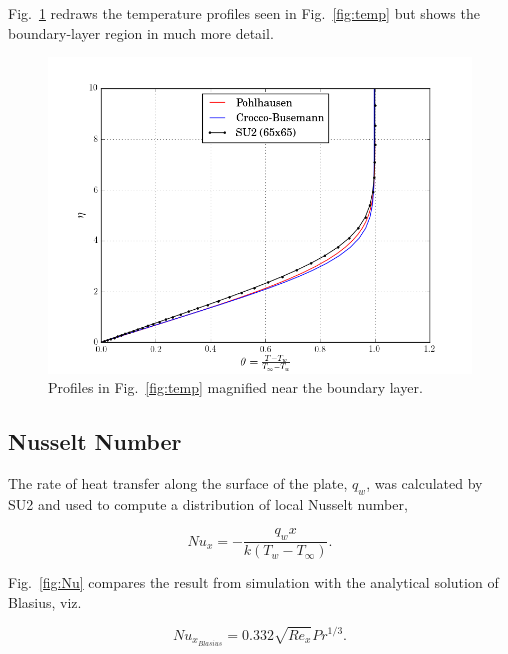 \documentclass[12pt,letterpaper]{article}
\begin{document}
Fig.~\ref{fig:temp_zoom} redraws the temperature profiles seen in Fig.~\ref{fig:temp} but shows the boundary-layer region in much more detail.
 
\begin{figure}[h] 
\centering
\includegraphics[width=\linewidth]{temp_350_zoom.png}
\caption{Profiles in Fig.~\ref{fig:temp} magnified near the boundary layer.}
\label{fig:temp_zoom}
\end{figure}

\subsection*{Nusselt Number}
The rate of heat transfer along the surface of the plate, $q_w$, was calculated by SU2 and used to compute a distribution of local Nusselt number,

\begin{equation*}
Nu_x = -\dfrac{q_wx}{k\left(T_w-T_\infty\right)}.
\end{equation*} 

Fig.~\ref{fig:Nu} compares the result from simulation with the analytical solution of Blasius, viz.

\begin{equation*}
Nu_{x_{Blasius}} = 0.332\sqrt{Re_x}Pr^{1/3}.
\end{equation*} 
\end{document}
